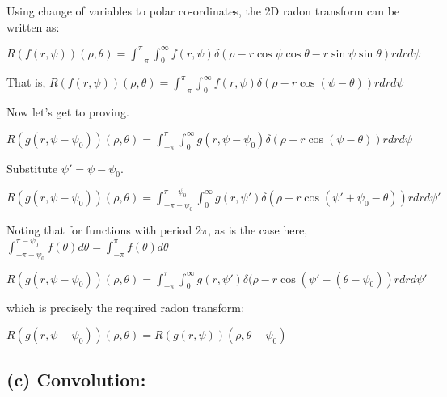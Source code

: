 \documentclass[fleqn, 11pt]{article}
\begin{document}
Using change of variables to polar co-ordinates, the 2D radon transform can be written as: 

\smallskip

$R (f(r, \psi)) (\rho, \theta) 
= \displaystyle \int_{-\pi}^{\pi} \int_{0}^{\infty}  f(r, \psi) \delta (\rho - r \cos \psi \cos \theta - r \sin \psi \sin \theta) r dr d \psi 
$

\medskip

That is, 
$ R (f(r, \psi)) (\rho, \theta) 
= \displaystyle \int_{-\pi }^{\pi} \int_{0}^{\infty}  f(r, \psi) \delta (\rho - r \cos (\psi - \theta) ) r dr d \psi 
$

\medskip

Now let's get to proving. 

\smallskip

$ R (g(r, \psi - \psi_0)) (\rho, \theta)  
= \displaystyle \int_{-\pi }^{\pi} \int_{0}^{\infty}  g(r, \psi - \psi_0) \delta (\rho - r \cos (\psi - \theta) ) r dr d \psi 
$

\medskip

Substitute $\psi' = \psi - \psi_0$. 

\smallskip

$ R (g(r, \psi - \psi_0)) (\rho, \theta)  
= \displaystyle \int_{-\pi - \psi_0 }^{\pi - \psi_0 } \int_{0}^{\infty}  g(r, \psi') \delta (\rho - r \cos (\psi' + \psi_0 - \theta) ) r dr d \psi' 
$

\medskip

Noting that for functions with period $2 \pi$, as is the case here,
$ \displaystyle \int_{-\pi - \psi_0 }^{\pi - \psi_0 } f(\theta) d \theta =  
\displaystyle \int_{-\pi  }^{\pi } f(\theta) d \theta 
$  

\medskip

$ R (g(r, \psi - \psi_0)) (\rho, \theta)  
= \displaystyle \int_{-\pi}^{\pi} \int_{0}^{\infty}  g(r, \psi') \delta (\rho - r \cos (\psi' - ( \theta- \psi_0)) r dr d \psi' 
$

\medskip

which is precisely the required radon transform:

\medskip

$ R (g(r, \psi - \psi_0)) (\rho, \theta)  
= R (g(r, \psi)) (\rho, \theta - \psi_0 )
$




\newpage 

\subsection*{(c) Convolution:}
\end{document}
